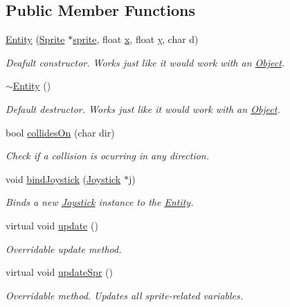 \subsection*{Public Member Functions}
\begin{DoxyCompactItemize}
\item 
\hyperlink{class_entity_adb44f34990023b1802bb95c280d62de0}{Entity} (\hyperlink{class_sprite}{Sprite} $\ast$\hyperlink{class_object_ad936466f3f6b6e8fa401842c573b44e6}{sprite}, float \hyperlink{class_object_a99addca3b5d96c214fa8f90474224699}{x}, float \hyperlink{class_object_a2870044ec214e97550ee28db89c6382a}{y}, char d)
\begin{DoxyCompactList}\small\item\em Deafult constructor. Works just like it would work with an \hyperlink{class_object}{Object}. \end{DoxyCompactList}\item 
\hyperlink{class_entity_adf6d3f7cb1b2ba029b6b048a395cc8ae}{$\sim$\-Entity} ()
\begin{DoxyCompactList}\small\item\em Default destructor. Works just like it would work with an \hyperlink{class_object}{Object}. \end{DoxyCompactList}\item 
bool \hyperlink{class_entity_aac771d739c55a8bf04a40a7d65d849e4}{collides\-On} (char dir)
\begin{DoxyCompactList}\small\item\em Check if a collision is ocurring in any direction. \end{DoxyCompactList}\item 
void \hyperlink{class_entity_a97bff8e950182981a271e548f63fb6c6}{bind\-Joystick} (\hyperlink{class_joystick}{Joystick} $\ast$j)
\begin{DoxyCompactList}\small\item\em Binds a new \hyperlink{class_joystick}{Joystick} instance to the \hyperlink{class_entity}{Entity}. \end{DoxyCompactList}\item 
virtual void \hyperlink{class_entity_a00b6eeaf99b35c8f8b10b5fbfc1baf4f}{update} ()
\begin{DoxyCompactList}\small\item\em Overridable update method. \end{DoxyCompactList}\item 
virtual void \hyperlink{class_entity_a0421cb8e2a3eda9f1f6c8fc0ae83bb15}{update\-Spr} ()
\begin{DoxyCompactList}\small\item\em Overridable method. Updates all sprite-\/related variables. \end{DoxyCompactList}\end{DoxyCompactItemize}
